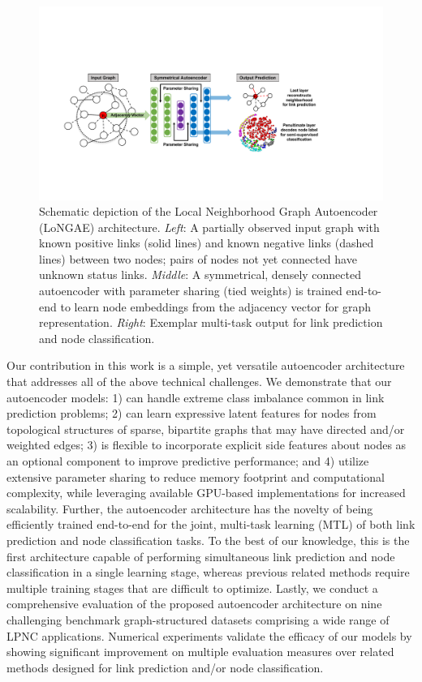\documentclass[letterpaper, conference]{IEEEtran}  %
\begin{document}
\begin{figure}
\centering
\includegraphics[width=\textwidth]{figure1.pdf}
\centering
\caption{Schematic depiction of the Local Neighborhood Graph Autoencoder (LoNGAE) architecture. \emph{Left}: A partially observed input graph with known positive links (solid lines) and known negative links (dashed lines) between two nodes; pairs of nodes not yet connected have unknown status links. \emph{Middle}: A symmetrical, densely connected autoencoder with parameter sharing (tied weights) is trained end-to-end to learn node embeddings from the adjacency vector for graph representation. \emph{Right}: Exemplar multi-task output for link prediction and node classification.}
\label{fig1}
\end{figure}

Our contribution in this work is a simple, yet versatile autoencoder architecture that addresses all of the above technical challenges. We demonstrate that our autoencoder models: 1) can handle extreme class imbalance common in link prediction problems; 2) can learn expressive latent features for nodes from topological structures of sparse, bipartite graphs that may have directed and/or weighted edges; 3) is flexible to incorporate explicit side features about nodes as an optional component to improve predictive performance; and 4) utilize extensive parameter sharing to reduce memory footprint and computational complexity, while leveraging available GPU-based implementations for increased scalability. Further, the autoencoder architecture has the novelty of being efficiently trained end-to-end for the joint, multi-task learning (MTL) of both link prediction and node classification tasks. To the best of our knowledge, this is the first architecture capable of performing simultaneous link prediction and node classification in a single learning stage, whereas previous related methods require multiple training stages that are difficult to optimize. Lastly, we conduct a comprehensive evaluation of the proposed autoencoder architecture on nine challenging benchmark graph-structured datasets comprising a wide range of LPNC applications. Numerical experiments validate the efficacy of our models by showing significant improvement on multiple evaluation measures over related methods designed for link prediction and/or node classification.
\end{document}
